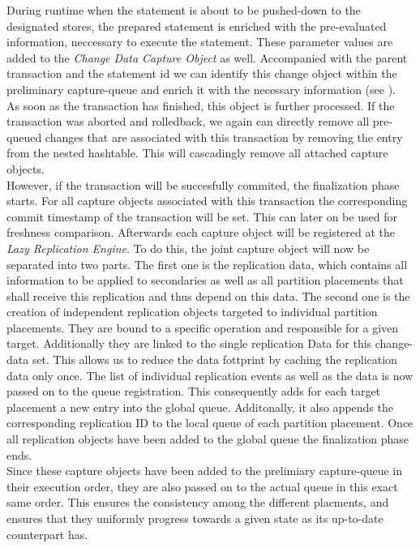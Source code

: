 During runtime when the statement is about to be pushed-down to the designated stores, the prepared statement is enriched with the pre-evaluated information, 
neccessary to execute the statement. These parameter values are added to the \emph{Change Data Capture Object} as well. 
Accompanied with the parent transaction and the statement id we can identify this change object within the preliminary capture-queue 
and enrich it with the necessary information (see ).\\
As soon as the transaction has finished, this object is further processed. If the transaction was aborted and rolledback, we again can directly remove all pre-queued changes 
that are associated with this transaction by removing the entry from the nested hashtable. This will cascadingly remove all attached capture objects.\\
However, if the transaction will be succesfully commited, the finalization phase starts. For all capture objects associated with this transaction the corresponding commit 
timestamp of the transaction will be set. This can later on be used for freshness comparison. Afterwards each capture object will be registered at the \emph{Lazy Replication Engine}. 
To do this, the joint capture object will now be separated into two parts. The first one is the replication data, which contains all information to be applied to 
secondaries as well as all partition placements that shall receive this replication and thus depend on this data. The second one is the creation of independent replication 
objects targeted to individual partition placements. They are bound to a specific operation and responsible for a given target. Additionally they are linked to the single replication Data for this change-data set.
This allows us to reduce the data fottprint by caching the replication data only once. The list of individual replication events as well as the data is now passed on to the
queue registration. This consequently adds for each target placement a new entry into the global queue. Additonally, it also appends the corresponding replication ID to 
the local queue of each partition placement. Once all replication objects have been added to the global queue the finalization phase ends.\\
Since these capture objects have been added to the prelimiary capture-queue in their execution order, they are also passed on to the actual queue in this exact same order.
This ensures the consistency among the different placments, and ensures that they uniformly progress towards a given state as its up-to-date counterpart has.\\

